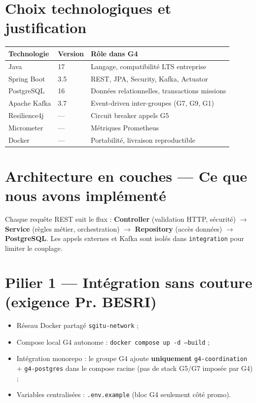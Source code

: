 \documentclass[12pt,a4paper]{report}
\begin{document}
\section{Choix technologiques et justification}
\begin{center}
\small
\begin{tabular}{@{}llp{7.5cm}@{}}
\toprule
\textbf{Technologie} & \textbf{Version} & \textbf{Rôle dans G4} \\
\midrule
Java & 17 & Langage, compatibilité LTS entreprise \\
Spring Boot & 3.5 & REST, JPA, Security, Kafka, Actuator \\
PostgreSQL & 16 & Données relationnelles, transactions missions \\
Apache Kafka & 3.7 & Event-driven inter-groupes (G7, G9, G1) \\
Resilience4j & — & Circuit breaker appels G5 \\
Micrometer & — & Métriques Prometheus \\
Docker & — & Portabilité, livraison reproductible \\
\bottomrule
\end{tabular}
\end{center}

\section{Architecture en couches — Ce que nous avons implémenté}
Chaque requête REST suit le flux : \textbf{Controller} (validation HTTP, sécurité) $\rightarrow$ \textbf{Service} (règles métier, orchestration) $\rightarrow$ \textbf{Repository} (accès données) $\rightarrow$ \textbf{PostgreSQL}. Les appels externes et Kafka sont isolés dans \texttt{integration} pour limiter le couplage.

\section{Pilier 1 — Intégration sans couture (exigence Pr. BESRI)}
\begin{itemize}[leftmargin=*]
    \item Réseau Docker partagé \texttt{sgitu-network} ;
    \item Compose local G4 autonome : \texttt{docker compose up -d --build} ;
    \item Intégration monorepo : le groupe G4 ajoute \textbf{uniquement} \texttt{g4-coordination} + \texttt{g4-postgres} dans le compose racine (pas de stack G5/G7 imposée par G4) ;
    \item Variables centralisées : \texttt{.env.example} (bloc G4 seulement côté promo).
\end{itemize}
\end{document}
